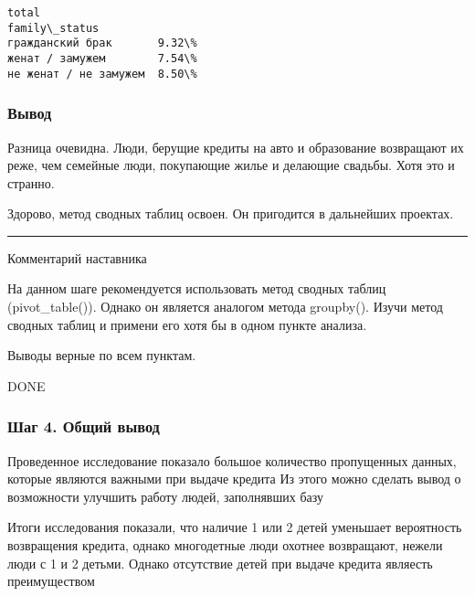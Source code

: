 \documentclass[11pt]{article}
\newcommand{\prompt}[4]{
        \llap{{\color{#2}[#3]: #4}}\vspace{-1.25em}
    }
\begin{document}
            \begin{tcolorbox}[breakable, boxrule=.5pt, size=fbox, pad at break*=1mm, opacityfill=0]
\prompt{Out}{outcolor}{270}{\hspace{3.5pt}}
\begin{Verbatim}[commandchars=\\\{\}]
                       total
family\_status
гражданский брак       9.32\%
женат / замужем        7.54\%
не женат / не замужем  8.50\%
\end{Verbatim}
\end{tcolorbox}
        
    \hypertarget{ux432ux44bux432ux43eux434}{%
\subsubsection{Вывод}\label{ux432ux44bux432ux43eux434}}

    Разница очевидна. Люди, берущие кредиты на авто и образование возвращают
их реже, чем семейные люди, покупающие жилье и делающие свадьбы. Хотя
это и странно.

    Здорово, метод сводных таблиц освоен. Он пригодится в дальнейших
проектах.

\begin{center}\rule{0.5\linewidth}{0.5pt}\end{center}

    Комментарий наставника

На данном шаге рекомендуется использовать метод сводных таблиц
(pivot\_table()). Однако он является аналогом метода groupby(). Изучи
метод сводных таблиц и примени его хотя бы в одном пункте анализа.

Выводы верные по всем пунктам.

    DONE

    \hypertarget{ux448ux430ux433-4.-ux43eux431ux449ux438ux439-ux432ux44bux432ux43eux434}{%
\subsubsection{Шаг 4. Общий
вывод}\label{ux448ux430ux433-4.-ux43eux431ux449ux438ux439-ux432ux44bux432ux43eux434}}

    Проведенное исследование показало большое количество пропущенных данных,
которые являются важными при выдаче кредита Из этого можно сделать вывод
о возможности улучшить работу людей, заполнявших базу

Итоги исследования показали, что наличие 1 или 2 детей уменьшает
вероятность возвращения кредита, однако многодетные люди охотнее
возвращают, нежели люди с 1 и 2 детьми. Однако отсутствие детей при
выдаче кредита являесть преимуществом
\end{document}
